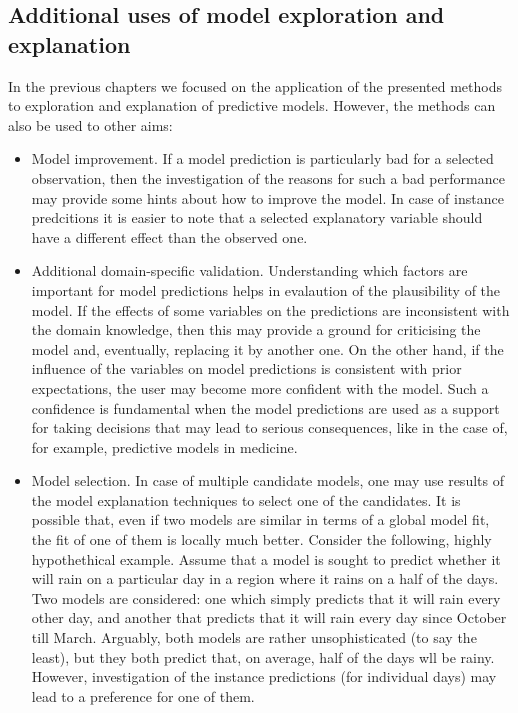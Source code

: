 \documentclass[12pt,]{krantz}
\begin{document}
\hypertarget{additional-uses-of-model-exploration-and-explanation}{%
\subsection{Additional uses of model exploration and explanation}\label{additional-uses-of-model-exploration-and-explanation}}

In the previous chapters we focused on the application of the presented methods to exploration and explanation of predictive models. However, the methods can also be used to other aims:

\begin{itemize}
\item
  Model improvement. If a model prediction is particularly bad for a selected observation, then the investigation of the reasons for such a bad performance may provide some hints about how to improve the model. In case of instance predcitions it is easier to note that a selected explanatory variable should have a different effect than the observed one.
\item
  Additional domain-specific validation. Understanding which factors are important for model predictions helps in evalaution of the plausibility of the model. If the effects of some variables on the predictions are inconsistent with the domain knowledge, then this may provide a ground for criticising the model and, eventually, replacing it by another one. On the other hand, if the influence of the variables on model predictions is consistent with prior expectations, the user may become more confident with the model. Such a confidence is fundamental when the model predictions are used as a support for taking decisions that may lead to serious consequences, like in the case of, for example, predictive models in medicine.
\item
  Model selection. In case of multiple candidate models, one may use results of the model explanation techniques to select one of the candidates. It is possible that, even if two models are similar in terms of a global model fit, the fit of one of them is locally much better. Consider the following, highly hypothethical example. Assume that a model is sought to predict whether it will rain on a particular day in a region where it rains on a half of the days. Two models are considered: one which simply predicts that it will rain every other day, and another that predicts that it will rain every day since October till March. Arguably, both models are rather unsophisticated (to say the least), but they both predict that, on average, half of the days wll be rainy. However, investigation of the instance predictions (for individual days) may lead to a preference for one of them.
\end{itemize}
\end{document}

